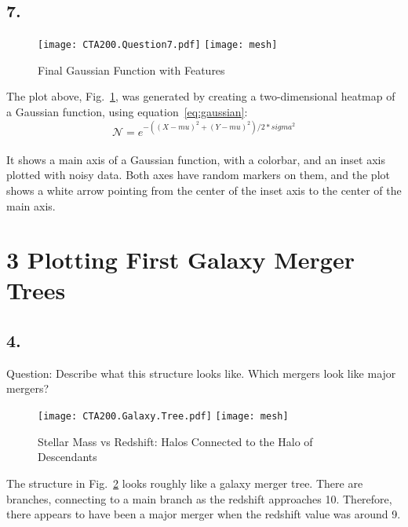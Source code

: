 \documentclass[12pt, letterpaper]{article}
\begin{document}
\subsection*{   7.}
\begin{figure}[H]
\texttt{[image: CTA200.Question7.pdf]}
\centering
    \texttt{[image: mesh]}
   \caption{Final Gaussian Function with Features}
    \label{fig:FinalGaussian}
\end{figure}

The plot above, Fig.~\ref{fig:FinalGaussian}, was generated by creating a two-dimensional heatmap of a Gaussian function, using equation~\ref{eq:gaussian}: 
\begin{equation}
\mathcal{N} = e^{-((X-mu)^2 + (Y-mu)^2)/2*sigma^2}
\label{eq:gaussian}
\end{equation}\\
It shows a main axis of a Gaussian function, with a colorbar, and an inset axis plotted with noisy data. Both axes have random markers on them, and the plot shows a white arrow pointing from the center of the inset axis to the center of the main axis. 
\section*{3 Plotting First Galaxy Merger Trees}

\subsection*{   4.}
Question: Describe what this structure looks like. Which mergers look like major mergers?\\
\begin{figure}[H]
\texttt{[image: CTA200.Galaxy.Tree.pdf]}
\centering
    \texttt{[image: mesh]}
   \caption{Stellar Mass vs Redshift: Halos Connected to the Halo of Descendants}
    \label{fig:galaxytree}
\end{figure}
The structure in Fig.~\ref{fig:galaxytree} looks roughly like a galaxy merger tree. There are branches, connecting to a main branch as the redshift approaches 10. Therefore, there appears to have been a major merger when the redshift value was around 9. 
\end{document}
